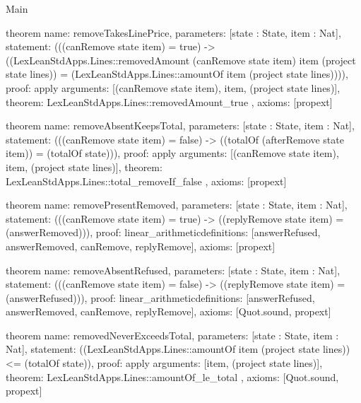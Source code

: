\begin{lexlean}{Main}
\begin{semanticmodule}
theorem{
  name: removeTakesLinePrice,
  parameters: [state : State, item : Nat],
  statement: (((canRemove state item) = true) -> ((LexLeanStdApps.Lines::removedAmount (canRemove state item) item (project state lines)) = (LexLeanStdApps.Lines::amountOf item (project state lines)))),
  proof: apply{
    arguments: [(canRemove state item), item, (project state lines)],
    theorem: LexLeanStdApps.Lines::removedAmount_true
  },
  axioms: [propext]
}

theorem{
  name: removeAbsentKeepsTotal,
  parameters: [state : State, item : Nat],
  statement: (((canRemove state item) = false) -> ((totalOf (afterRemove state item)) = (totalOf state))),
  proof: apply{
    arguments: [(canRemove state item), item, (project state lines)],
    theorem: LexLeanStdApps.Lines::total_removeIf_false
  },
  axioms: [propext]
}

theorem{
  name: removePresentRemoved,
  parameters: [state : State, item : Nat],
  statement: (((canRemove state item) = true) -> ((replyRemove state item) = (answerRemoved))),
  proof: linear_arithmetic{definitions: [answerRefused, answerRemoved, canRemove, replyRemove]},
  axioms: [propext]
}

theorem{
  name: removeAbsentRefused,
  parameters: [state : State, item : Nat],
  statement: (((canRemove state item) = false) -> ((replyRemove state item) = (answerRefused))),
  proof: linear_arithmetic{definitions: [answerRefused, answerRemoved, canRemove, replyRemove]},
  axioms: [Quot.sound, propext]
}

theorem{
  name: removedNeverExceedsTotal,
  parameters: [state : State, item : Nat],
  statement: ((LexLeanStdApps.Lines::amountOf item (project state lines)) <= (totalOf state)),
  proof: apply{
    arguments: [item, (project state lines)],
    theorem: LexLeanStdApps.Lines::amountOf_le_total
  },
  axioms: [Quot.sound, propext]
}
\end{semanticmodule}
\end{lexlean}
